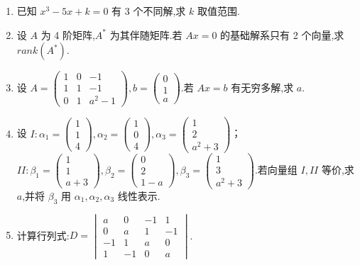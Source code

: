 \begin{enumerate}
	\item 已知 $x^3 - 5x + k = 0$ 有 3 个不同解,求 $k$ 取值范围.
	
	\item 设 $A$ 为 4 阶矩阵,$A^*$ 为其伴随矩阵.若 $Ax=0$ 的基础解系只有 2 个向量,求 $rank(A^*)$.
	
	\item 设 $A = \begin{pmatrix} 1 & 0 & -1 \\ 1 & 1 & -1 \\ 0 & 1 & a^2-1 \end{pmatrix}, b = \begin{pmatrix} 0 \\ 1 \\ a \end{pmatrix}$.若 $Ax=b$ 有无穷多解,求 $a$.
	
	\item 设 $I: \alpha_1 = \begin{pmatrix} 1 \\ 1 \\ 4 \end{pmatrix}, \alpha_2 = \begin{pmatrix} 1 \\ 0 \\ 4 \end{pmatrix}, \alpha_3 = \begin{pmatrix} 1 \\ 2 \\ a^2+3 \end{pmatrix}$；$II: \beta_1 = \begin{pmatrix} 1 \\ 1 \\ a+3 \end{pmatrix}, \beta_2 = \begin{pmatrix} 0 \\ 2 \\ 1-a \end{pmatrix}, \beta_3 = \begin{pmatrix} 1 \\ 3 \\ a^2+3 \end{pmatrix}$.若向量组 $I, II$ 等价,求 $a$,并将 $\beta_3$ 用 $\alpha_1, \alpha_2, \alpha_3$ 线性表示.
	
	\item 计算行列式:$D = \begin{vmatrix} a & 0 & -1 & 1 \\ 0 & a & 1 & -1 \\ -1 & 1 & a & 0 \\ 1 & -1 & 0 & a \end{vmatrix}$.
	

\end{enumerate}
